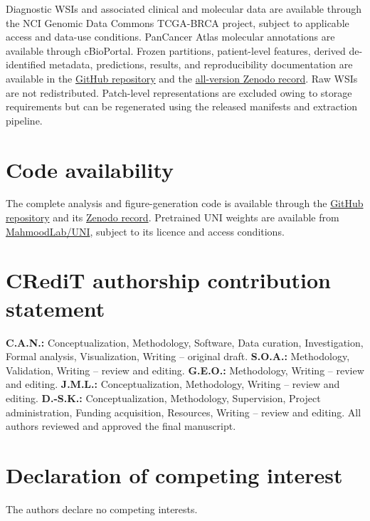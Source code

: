 \documentclass[pdflatex]{cas-dc}
\theoremstyle{remark}
\theoremstyle{plain}
\begin{document}
Diagnostic WSIs and associated clinical and molecular data are available through the NCI Genomic Data Commons TCGA-BRCA project, subject to applicable access and data-use conditions. PanCancer Atlas molecular annotations are available through cBioPortal. Frozen partitions, patient-level features, derived de-identified metadata, predictions, results, and reproducibility documentation are available in the \href{https://github.com/Gozie01/tcga-brca-cross-site-foundation-model}{GitHub repository} and the \href{https://doi.org/10.5281/zenodo.22668916}{all-version Zenodo record}. Raw WSIs are not redistributed. Patch-level representations are excluded owing to storage requirements but can be regenerated using the released manifests and extraction pipeline.

\section*{Code availability}

The complete analysis and figure-generation code is available through the \href{https://github.com/Gozie01/tcga-brca-cross-site-foundation-model}{GitHub repository} and its \href{https://doi.org/10.5281/zenodo.22668916}{Zenodo record}. Pretrained UNI weights are available from \href{https://huggingface.co/MahmoodLab/UNI}{MahmoodLab/UNI}, subject to its licence and access conditions.

\section*{CRediT authorship contribution statement}

\textbf{C.A.N.:} Conceptualization, Methodology, Software, Data curation, Investigation, Formal analysis, Visualization, Writing -- original draft.
\textbf{S.O.A.:} Methodology, Validation, Writing -- review and editing.
\textbf{G.E.O.:} Methodology, Writing -- review and editing.
\textbf{J.M.L.:} Conceptualization, Methodology, Writing -- review and editing.
\textbf{D.-S.K.:} Conceptualization, Methodology, Supervision, Project administration, Funding acquisition, Resources, Writing -- review and editing.
All authors reviewed and approved the final manuscript.

\section*{Declaration of competing interest}

The authors declare no competing interests.
\end{document}
